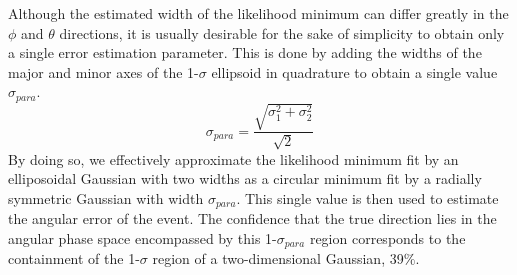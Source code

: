 \documentclass{gatech-thesis}
\begin{document}
Although the estimated width of the likelihood minimum can differ greatly in the $\phi$ and $\theta$ directions, it is usually desirable for the sake of simplicity to obtain only a single error estimation parameter. This is done by adding the widths of the major and minor axes of the 1-$\sigma$ ellipsoid in quadrature to obtain a single value $\sigma_{para}$.
\begin{equation}
\sigma_{para} = \frac{\sqrt{\sigma_{1}^2 + \sigma_{2}^2}}{\sqrt{2}}
\end{equation}
By doing so, we effectively approximate the likelihood minimum fit by an elliposoidal Gaussian with two widths as a circular minimum fit by a radially symmetric Gaussian with width $\sigma_{para}$. This single value is then used to estimate the angular error of the event. The confidence that the true direction lies in the angular phase space encompassed by this 1-$\sigma_{para}$ region corresponds to the containment of the 1-$\sigma$ region of a two-dimensional Gaussian, 39$\%$.
\end{document}
